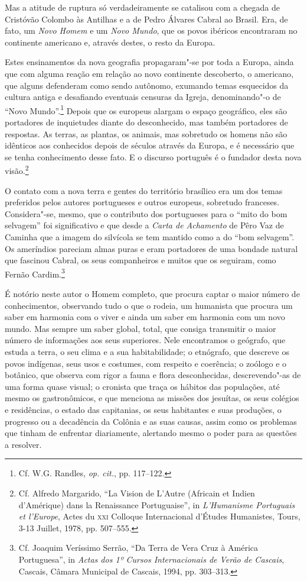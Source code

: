  Mas a atitude de ruptura só verdadeiramente se catalisou com a
chegada de Cristóvão Colombo às Antilhas e a de Pedro Álvares Cabral
ao Brasil. Era, de fato, um \textit{Novo Homem} e um \textit{Novo
Mundo}, que os povos ibéricos encontraram no continente americano e,
através destes, o resto da Europa.

Estes ensinamentos da nova geografia propagaram"-se por toda a Europa,
ainda que com alguma reação em relação ao novo continente descoberto,
o americano, que alguns defenderam como sendo autônomo, exumando temas
esquecidos da cultura antiga e desafiando eventuais censuras da
Igreja, denominando"-o de ``Novo Mundo''.\footnote{ Cf. W.G. Randles,
\textit{op. cit.}, pp. 117--122.} Depois que os europeus alargam o
espaço geográfico, eles são portadores de inquietudes diante do
desconhecido, mas também portadores de respostas. As terras, as
plantas, os animais, mas sobretudo os homens não são idênticos aos
conhecidos depois de séculos através da Europa, e é necessário que se
tenha conhecimento desse fato. E o discurso português é o fundador
desta nova visão.\footnote{ Cf. Alfredo Margarido, ``La Vision de
L'Autre (Africain et Indien d'Amérique) dans la Renaissance
Portuguaise'', in \textit{L'Humanisme Portuguais et l'Europe}, Actes
du \textsc{xxi} Colloque Internacional d'Études Humanistes, Tours, 3-13
Juillet, 1978, pp. 507--555.} 

O contato com a nova terra e gentes do território brasílico era um
dos temas preferidos pelos autores portugueses e outros europeus,
sobretudo franceses. Considera"-se, mesmo, que o contributo dos
portugueses para o ``mito do bom selvagem'' foi significativo e que
desde a \textit{Carta de Achamento} de Pêro Vaz de Caminha que a
imagem do silvícola se tem mantido como a do ``bom selvagem''. Os
ameríndios pareciam almas puras e eram portadores de uma bondade
natural que fascinou Cabral, os seus companheiros e muitos que os
seguiram, como Fernão Cardim.\footnote{ Cf. Joaquim Veríssimo
Serrão, ``Da Terra de Vera Cruz à América Portuguesa'', in
\textit{Actas dos 1º Cursos Internacionais de Verão de Cascais}, 
Cascais, Câmara Municipal de Cascais, 1994, pp. 303--313.} 

É notório neste autor o Homem completo, que procura captar o maior
número de conhecimentos, observando tudo o que o rodeia, um humanista
que procura um saber em harmonia com o viver e ainda um saber em
harmonia com um novo mundo. Mas sempre um saber global, total, que
consiga transmitir o maior número de informações aos seus superiores.
Nele encontramos o geógrafo, que estuda a terra, o seu clima e a sua
habitabilidade; o etnógrafo, que descreve os povos indígenas, seus usos
e costumes, com respeito e coerência; o zoólogo e o botânico, que
observa com rigor a fauna e flora desconhecidas, descrevendo"-as de uma
forma quase visual; o cronista que traça os hábitos das populações, até
mesmo os gastronômicos, e que menciona as missões dos jesuítas, os seus
colégios e residências, o estado das capitanias, os seus habitantes e
suas produções, o progresso ou a decadência da Colônia e as suas
causas, assim como os problemas que tinham de enfrentar diariamente,
alertando mesmo o poder para as questões a resolver.

